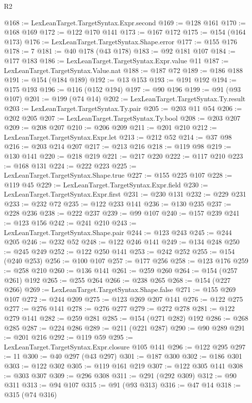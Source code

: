 \begin{lexlean}{R2}
\begin{coremodule}
{{{{{{{{{{{{{{{{{{{{{{{{{{{{{{{{{{{{{{{{{{{{{{{{{{{{{{{{{{{{{{{{{{{{{{{{{{{{{{{{{{{{{{{{{{{{@168 := LexLeanTarget.TargetSyntax.Expr.second
@169 := @128 @161
@170 := @168 @169
@172 := @122 @170 @141
@173 := @167 @172
@175 := @154 (@164 @173)
@176 := LexLeanTarget.TargetSyntax.Shape.error
@177 := @155 @176
@178 := 7
@181 := @40 @178 (@43 @178)
@183 := @92 @181 @107
@184 := @177 @183
@186 := LexLeanTarget.TargetSyntax.Expr.value @11
@187 := LexLeanTarget.TargetSyntax.Value.nat
@188 := @187 @72
@189 := @186 @188
@191 := @154 (@184 @189)
@192 := @13 @153
@193 := @191 @192
@194 := @175 @193
@196 := @116 (@152 @194)
@197 := @90 @196
@199 := @91 (@93 @107)
@201 := @199 (@74 @14)
@202 := LexLeanTarget.TargetSyntax.Ty.result
@203 := LexLeanTarget.TargetSyntax.Ty.pair
@205 := @203 @11 @54
@206 := @202 @205
@207 := LexLeanTarget.TargetSyntax.Ty.bool
@208 := @203 @207
@209 := @208 @207
@210 := @206 @209
@211 := @201 @210
@212 := LexLeanTarget.TargetSyntax.Expr.let
@213 := @212 @52
@214 := @37 @98
@216 := @203 @214 @207
@217 := @213 @216
@218 := @119 @98
@219 := @130 @141
@220 := @218 @219
@221 := @217 @220
@222 := @117 @210
@223 := @168 @131
@224 := @222 @223
@225 := LexLeanTarget.TargetSyntax.Shape.true
@227 := @155 @225 @107
@228 := @119 @45
@229 := LexLeanTarget.TargetSyntax.Expr.field
@230 := LexLeanTarget.TargetSyntax.Expr.first
@231 := @230 @131
@232 := @229 @231
@233 := @232 @72
@235 := @122 @233 @141
@236 := @130 @235
@237 := @228 @236
@238 := @222 @237
@239 := @99 @107
@240 := @157 @239
@241 := @123 @156
@242 := @241 @210
@243 := LexLeanTarget.TargetSyntax.Shape.pair
@244 := @123 @243
@245 := @244 @205
@246 := @232 @52
@248 := @122 @246 @141
@249 := @134 @248
@250 := @245 @249
@252 := @122 @250 @141
@253 := @242 @252
@255 := @154 (@240 @253)
@256 := @100 @107
@257 := @177 @256
@258 := @123 @176
@259 := @258 @210
@260 := @136 @141
@261 := @259 @260
@264 := @154 (@257 @261) @192
@265 := @255 @264
@266 := @238 @265
@268 := @154 (@227 @266)
@269 := LexLeanTarget.TargetSyntax.Shape.false
@271 := @155 @269 @107
@272 := @244 @209
@275 := @123 @269 @207 @141
@276 := @122 @275
@277 := @276 @141
@278 := @276 @277
@279 := @272 @278
@281 := @122 @279 @141
@282 := @259 @281
@285 := @154 (@271 @282) @192
@286 := @268 @285
@287 := @224 @286
@289 := @211 (@221 @287)
@290 := @90 @289
@291 := @201 @216
@292 := @119 @59
@295 := LexLeanTarget.TargetSyntax.Expr.closure @105 @141
@296 := @122 @295
@297 := 11
@300 := @40 @297 (@43 @297)
@301 := @187 @300
@302 := @186 @301
@303 := @122 @302
@305 := @119 @161 @219
@307 := @122 @305 @141
@308 := @303 @307
@309 := @296 @308
@311 := @291 (@292 @309)
@312 := @90 @311
@313 := @94 @107
@315 := @91 (@93 @313)
@316 := @47 @14
@318 := @315 (@74 @316)
}}}}}}}}}}}}}}}}}}}}}}}}}}}}}}}}}}}}}}}}}}}}}}}}}}}}}}}}}}}}}}}}}}}}}}}}}}}}}}}}}}}}}}}}}}}}
\end{coremodule}
\end{lexlean}

